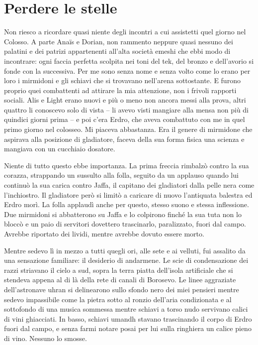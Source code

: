 \chapter{Perdere le stelle}

Non riesco a ricordare quasi niente degli incontri a cui assistetti quel
giorno nel Colosso. A parte Anaïs e Dorian, non rammento neppure quasi
nessuno dei palatini e dei patrizi appartenenti all'alta società emeshi
che ebbi modo di incontrare: ogni faccia perfetta scolpita nei toni del
tek, del bronzo e dell'avorio si fonde con la successiva. Per me sono
senza nome e senza volto come lo erano per loro i mirmidoni e gli
schiavi che si trovavano nell'arena sottostante. E furono proprio quei
combattenti ad attirare la mia attenzione, non i frivoli rapporti
sociali. Alis e Light erano nuovi e più o meno non ancora messi alla
prova, altri quattro li conoscevo solo di vista -- li avevo visti
mangiare alla mensa non più di quindici giorni prima -- e poi c'era
Erdro, che aveva combattuto con me in quel primo giorno nel colosseo. Mi
piaceva abbastanza. Era il genere di mirmidone che aspirava alla
posizione di gladiatore, faceva della sua forma fisica una scienza e
mangiava con un cucchiaio dosatore.

Niente di tutto questo ebbe importanza. La prima freccia rimbalzò contro
la sua corazza, strappando un sussulto alla folla, seguito da un
applauso quando lui continuò la sua carica contro Jaffa, il capitano dei
gladiatori dalla pelle nera come l'inchiostro. Il gladiatore però si
limitò a caricare di nuovo l'antiquata balestra ed Erdro morì. La folla
applaudì anche per questo, stesso suono e stessa inflessione. Due
mirmidoni si abbatterono su Jaffa e lo colpirono finché la sua tuta non
lo bloccò e un paio di servitori dovettero trascinarlo, paralizzato,
fuori dal campo. Avrebbe riportato dei lividi, mentre avrebbe dovuto
essere morto.

Mentre sedevo lì in mezzo a tutti quegli ori, alle sete e ai velluti,
fui assalito da una sensazione familiare: il desiderio di andarmene. Le
scie di condensazione dei razzi striavano il cielo a sud, sopra la terra
piatta dell'isola artificiale che si stendeva appena al di là della rete
di canali di Borosevo. Le linee aggraziate dell'astronave uhran si
delinearono sullo sfondo nero dei miei pensieri mentre sedevo
impassibile come la pietra sotto al ronzio dell'aria condizionata e al
sottofondo di una musica sommessa mentre schiavi a torso nudo servivano
calici di vini ghiacciati. In basso, schiavi umandh stavano trascinando
il corpo di Erdro fuori dal campo, e senza farmi notare posai per lui
sulla ringhiera un calice pieno di vino. Nessuno lo smosse.

